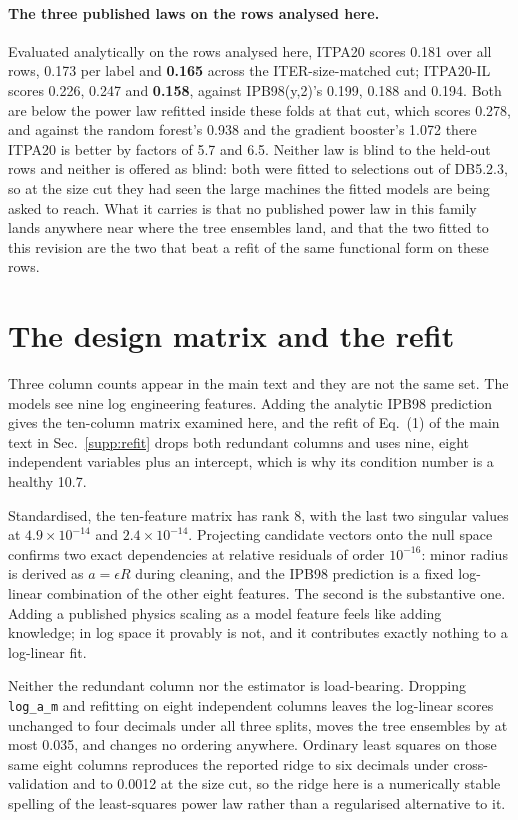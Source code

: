 \documentclass[12pt,letterpaper]{article}
\begin{document}
\paragraph{The three published laws on the rows analysed here.}
Evaluated analytically on the rows analysed here, ITPA20 scores 0.181 over all
rows, 0.173 per label and \textbf{0.165} across the ITER-size-matched cut;
ITPA20-IL scores 0.226, 0.247 and \textbf{0.158}, against IPB98(y,2)'s 0.199,
0.188 and 0.194. Both are below the power law refitted inside these folds at
that cut, which scores 0.278, and against the random forest's 0.938 and the
gradient booster's 1.072 there ITPA20 is better by factors of 5.7 and 6.5. Neither
law is blind to the held-out rows and neither is offered as blind: both were fitted to selections out
of DB5.2.3, so at the size cut they had seen the large machines the fitted
models are being asked to reach. What it carries is that no published power law
in this family lands anywhere near where the tree ensembles land, and that the
two fitted to this revision are the two that beat a refit of the same functional
form on these rows.

\section{The design matrix and the refit}
\label{supp:rank}

Three column counts appear in the main text and they are not the same set. The
models see nine log engineering features. Adding the analytic IPB98 prediction
gives the ten-column matrix examined here, and the refit of
Eq.~(1) of the main text in Sec.~\ref{supp:refit} drops both redundant columns and
uses nine, eight independent variables plus an intercept, which is why its
condition number is a healthy 10.7.

Standardised, the ten-feature matrix has rank 8, with the last two singular
values at $4.9\times10^{-14}$ and $2.4\times10^{-14}$. Projecting candidate
vectors onto the null space confirms two exact dependencies at relative
residuals of order $10^{-16}$: minor radius is derived as $a=\epsilon R$ during
cleaning, and the IPB98 prediction is a fixed log-linear combination of the
other eight features. The second is the substantive one. Adding a published
physics scaling as a model feature feels like adding knowledge; in log space it
provably is not, and it contributes exactly nothing to a log-linear fit.

Neither the redundant column nor the estimator is load-bearing. Dropping
\texttt{log\_a\_m} and refitting on eight independent columns leaves the
log-linear scores unchanged to four decimals under all three splits, moves the
tree ensembles by at most 0.035, and changes no ordering anywhere. Ordinary
least squares on those same eight columns reproduces the reported ridge to six
decimals under cross-validation and to 0.0012 at the size cut, so the ridge here
is a numerically stable spelling of the least-squares power law rather than a
regularised alternative to it.
\end{document}
